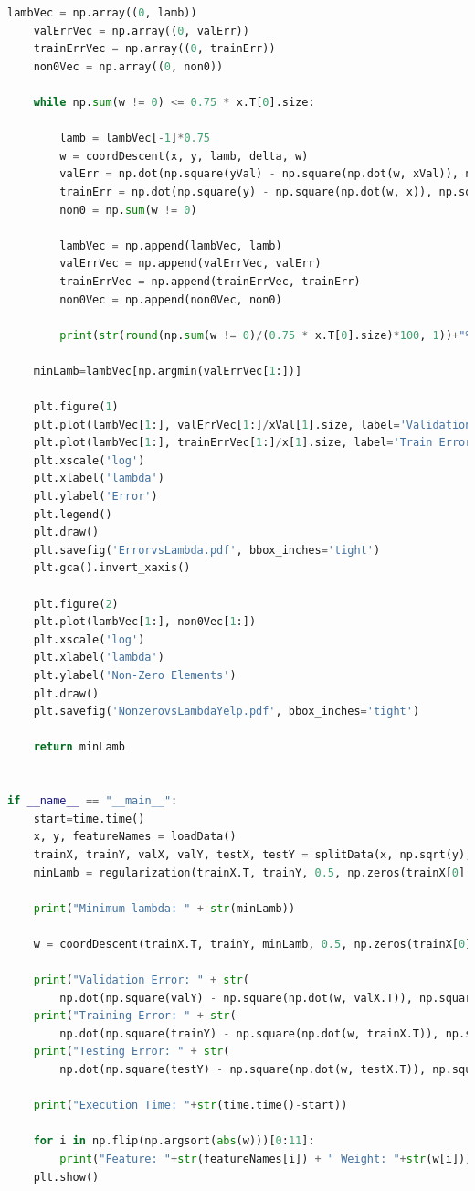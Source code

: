 \documentclass{article}
\newcommand{\1}{\mathbf{1}}
\begin{document}
\begin{lstlisting}[language=Python]
    lambVec = np.array((0, lamb))
    valErrVec = np.array((0, valErr))
    trainErrVec = np.array((0, trainErr))
    non0Vec = np.array((0, non0))

    while np.sum(w != 0) <= 0.75 * x.T[0].size:

        lamb = lambVec[-1]*0.75
        w = coordDescent(x, y, lamb, delta, w)
        valErr = np.dot(np.square(yVal) - np.square(np.dot(w, xVal)), np.square(yVal) - np.square(np.dot(w, xVal)))
        trainErr = np.dot(np.square(y) - np.square(np.dot(w, x)), np.square(y) - np.square(np.dot(w, x)))
        non0 = np.sum(w != 0)

        lambVec = np.append(lambVec, lamb)
        valErrVec = np.append(valErrVec, valErr)
        trainErrVec = np.append(trainErrVec, trainErr)
        non0Vec = np.append(non0Vec, non0)

        print(str(round(np.sum(w != 0)/(0.75 * x.T[0].size)*100, 1))+"% Done")

    minLamb=lambVec[np.argmin(valErrVec[1:])]

    plt.figure(1)
    plt.plot(lambVec[1:], valErrVec[1:]/xVal[1].size, label='Validation Error')
    plt.plot(lambVec[1:], trainErrVec[1:]/x[1].size, label='Train Error')
    plt.xscale('log')
    plt.xlabel('lambda')
    plt.ylabel('Error')
    plt.legend()
    plt.draw()
    plt.savefig('ErrorvsLambda.pdf', bbox_inches='tight')
    plt.gca().invert_xaxis()

    plt.figure(2)
    plt.plot(lambVec[1:], non0Vec[1:])
    plt.xscale('log')
    plt.xlabel('lambda')
    plt.ylabel('Non-Zero Elements')
    plt.draw()
    plt.savefig('NonzerovsLambdaYelp.pdf', bbox_inches='tight')

    return minLamb


if __name__ == "__main__":
    start=time.time()
    x, y, featureNames = loadData()
    trainX, trainY, valX, valY, testX, testY = splitData(x, np.sqrt(y), 4000, 5000)
    minLamb = regularization(trainX.T, trainY, 0.5, np.zeros(trainX[0].size), valX.T, valY)

    print("Minimum lambda: " + str(minLamb))

    w = coordDescent(trainX.T, trainY, minLamb, 0.5, np.zeros(trainX[0].size))

    print("Validation Error: " + str(
        np.dot(np.square(valY) - np.square(np.dot(w, valX.T)), np.square(valY) - np.square(np.dot(w, valX.T)))/valY.size))
    print("Training Error: " + str(
        np.dot(np.square(trainY) - np.square(np.dot(w, trainX.T)), np.square(trainY) - np.square(np.dot(w, trainX.T)))/trainY.size))
    print("Testing Error: " + str(
        np.dot(np.square(testY) - np.square(np.dot(w, testX.T)), np.square(testY) - np.square(np.dot(w, testX.T)))/testY.size))

    print("Execution Time: "+str(time.time()-start))

    for i in np.flip(np.argsort(abs(w)))[0:11]:
        print("Feature: "+str(featureNames[i]) + " Weight: "+str(w[i]))
    plt.show()
\end{lstlisting}
\end{document}
